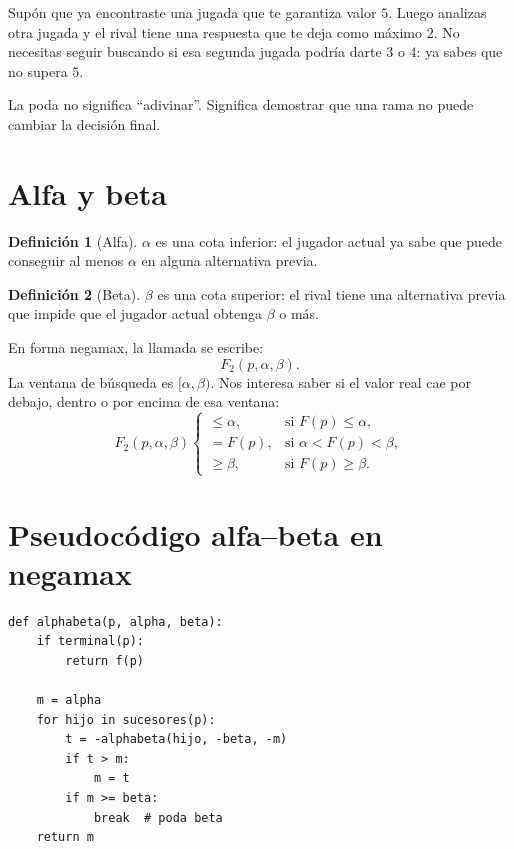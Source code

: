 \documentclass[11pt,a4paper]{article}
\theoremstyle{definition}
\newtheorem{definition}{Definición}[section]
\begin{document}
Supón que ya encontraste una jugada que te garantiza valor $5$. Luego analizas otra jugada y el rival tiene una respuesta que te deja como máximo $2$. No necesitas seguir buscando si esa segunda jugada podría darte $3$ o $4$: ya sabes que no supera $5$.

\begin{warningbox}
La poda no significa ``adivinar''. Significa demostrar que una rama no puede cambiar la decisión final.
\end{warningbox}

\section{Alfa y beta}

\begin{definition}[Alfa]
$\alpha$ es una cota inferior: el jugador actual ya sabe que puede conseguir al menos $\alpha$ en alguna alternativa previa.
\end{definition}

\begin{definition}[Beta]
$\beta$ es una cota superior: el rival tiene una alternativa previa que impide que el jugador actual obtenga $\beta$ o más.
\end{definition}

En forma negamax, la llamada se escribe:
\[
F_2(p,\alpha,\beta).
\]
La ventana de búsqueda es $[\alpha,\beta)$. Nos interesa saber si el valor real cae por debajo, dentro o por encima de esa ventana:
\[
F_2(p,\alpha,\beta)\begin{cases}
\le \alpha, & \text{si }F(p)\le \alpha,\\
=F(p), & \text{si }\alpha < F(p)<\beta,\\
\ge \beta, & \text{si }F(p)\ge \beta.
\end{cases}
\]

\section{Pseudocódigo alfa--beta en negamax}

\begin{lstlisting}[style=pythonSoft]
def alphabeta(p, alpha, beta):
    if terminal(p):
        return f(p)

    m = alpha
    for hijo in sucesores(p):
        t = -alphabeta(hijo, -beta, -m)
        if t > m:
            m = t
        if m >= beta:
            break  # poda beta
    return m
\end{lstlisting}
\end{document}
